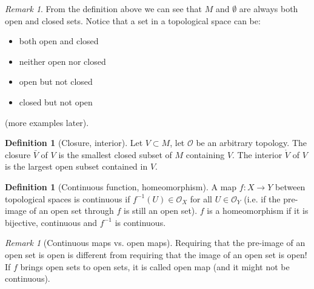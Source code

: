 \documentclass[a4paper,11pt,titlepage]{article}
\numberwithin{equation}{section}
\theoremstyle{definition}
\newtheorem{definition}[theorem]{Definition}
\theoremstyle{remark}
\newtheorem{remark}[theorem]{Remark}
\begin{document}
\begin{remark}
From the definition above we can see that $M$ and $\emptyset$ are always both open and closed sets. Notice that a set in a topological space can be: \begin{itemize}
\item both open and closed
\item neither open nor closed
\item open but not closed
\item closed but not open
\end{itemize}
(more examples later).
\end{remark}

\begin{definition}[Closure, interior]
Let $V \subset M$, let $\mathcal{O}$ be an arbitrary topology. The closure $\bar V $ of $V$ is the smallest closed subset of $M$ containing $V$. The interior $\mathring V$ of $V$ is the largest open subset contained in $V$.
\end{definition} %

\begin{definition}[Continuous function, homeomorphism] \label{topcontinuity}
A map $f \colon X \rightarrow Y$ between topological spaces is continuous if $f^{-1}(U) \in \mathcal{O}_X$ for all $U \in \mathcal{O}_Y$ (i.e. if the pre-image of an open set through $f$ is still an open set). $f$ is a homeomorphism if it is bijective, continuous and $f^{-1}$ is continuous.
\end{definition}

\begin{remark}[Continuous maps vs. open maps]
Requiring that the pre-image of an open set is open is different from requiring that the image of an open set is open! If $f$ brings open sets to open sets, it is called open map (and it might not be continuous).
\end{remark}
\end{document}
